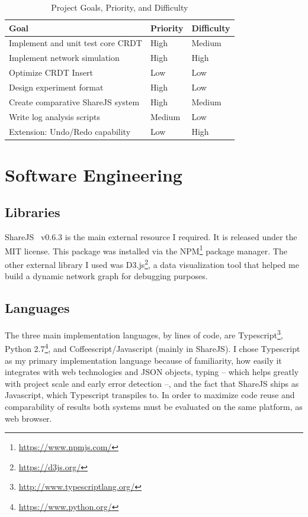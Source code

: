 \documentclass[12pt,a4paper,twoside,openright]{report}
\begin{document}
\begin{center}
\begin{table}[H]
\centering
\caption{Project Goals, Priority, and Difficulty}
\label{table: goals}
\begin{tabular}{@{}lll@{}}
Goal											 	& Priority & Difficulty \\ \toprule
Implement and unit test core CRDT                	& High     & Medium \\ \midrule
Implement network simulation                     	& High     & High   \\ \midrule
Optimize CRDT Insert                             	& Low      & Low    \\ \midrule
Design experiment format                         	& High     & Low    \\ \midrule
Create comparative ShareJS system					& High     & Medium \\ \midrule
Write log analysis scripts                       	& Medium   & Low    \\ \midrule
Extension: Undo/Redo capability						& Low	   & High 	\\ \bottomrule
\end{tabular}
\end{table}
\end{center}



\section{Software Engineering}

	\subsection{Libraries}
	ShareJS~\cite{sharejs} v0.6.3 is the main external resource I required. It is released under the MIT license. This package was installed via the NPM\footnote{\url{https://www.npmjs.com/}} package manager. The other external library I used was D3.js\footnote{\url{https://d3js.org/}}, a data visualization tool that helped me build a dynamic network graph for debugging purposes.
	
	\subsection{Languages}
	The three main implementation languages, by lines of code, are Typescript\footnote{\url{http://www.typescriptlang.org/}}, Python 2.7\footnote{\url{https://www.python.org/}}, and Coffeescript/Javascript  (mainly in ShareJS). I chose Typescript as my primary implementation language because of familiarity, how easily it integrates with web technologies and JSON objects, typing -- which helps greatly with project scale and early error detection --, and the fact that ShareJS ships as Javascript, which Typescript transpiles to. In order to maximize code reuse and comparability of results both systems must be evaluated on the same platform, as web browser.
	
\end{document}
